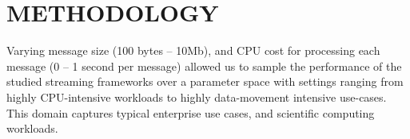 \documentclass[conference]{IEEEtran}
\begin{document}






\section{METHODOLOGY}\label{method}


Varying message size (100 bytes -- 10Mb), and CPU cost for processing each message (0 -- 1 second per message)
allowed us to sample the performance of the studied streaming frameworks over a parameter space with settings ranging from highly CPU-intensive workloads to highly data-movement intensive use-cases. This domain captures typical enterprise use cases, and scientific computing workloads.
\end{document}
